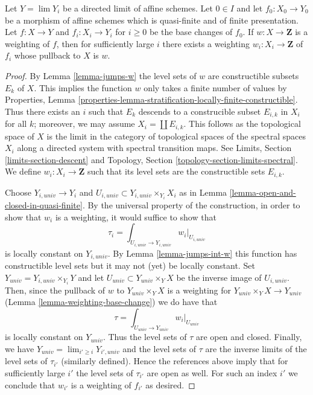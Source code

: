 \begin{lemma}
\label{lemma-descend-weighting}
Let $Y = \lim Y_i$ be a directed limit of affine schemes. Let $0 \in I$
and let $f_0 : X_0 \to Y_0$ be a morphism of affine schemes which is
quasi-finite and of finite presentation. Let $f : X  \to Y$
and $f_i : X_i \to Y_i$ for $i \geq 0$ be the base changes of $f_0$.
If $w : X \to \mathbf{Z}$ is a weighting of $f$, then for sufficiently
large $i$ there exists a weighting $w_i : X_i \to \mathbf{Z}$
of $f_i$ whose pullback to $X$ is $w$.
\end{lemma}

\begin{proof}
By Lemma \ref{lemma-jumps-w} the level sets of $w$ are constructible subsets
$E_k$ of $X$. This implies the function $w$ only takes a finite number
of values by Properties, Lemma
\ref{properties-lemma-stratification-locally-finite-constructible}.
Thus there exists an $i$ such that $E_k$ descends to a construcible
subset $E_{i, k}$ in $X_i$ for all $k$; moreover, we may assume
$X_i = \coprod E_{i, k}$. This follows as the topological space
of $X$ is the limit in the category of topological spaces
of the spectral spaces $X_i$ along a directed system with
spectral transition maps. See
Limits, Section \ref{limits-section-descent}
and
Topology, Section \ref{topology-section-limits-spectral}.
We define $w_i : X_i \to \mathbf{Z}$ such that its level
sets are the constructible sets $E_{i, k}$.

\medskip\noindent
Choose $Y_{i, univ} \to Y_i$ and
$U_{i, univ} \subset Y_{i, univ} \times_{Y_i} X_i$
as in Lemma \ref{lemma-open-and-closed-in-quasi-finite}.
By the universal property of the construction, in order to
show that $w_i$ is a weighting, it would suffice to show
that
$$
\tau_i = \textstyle{\int}_{U_{i, univ} \to Y_{i, univ}} w_i|_{U_{i, univ}}
$$
is locally constant on $Y_{i, univ}$. By Lemma \ref{lemma-jumps-int-w}
this function has constructible level sets but it may
not (yet) be locally constant. Set
$Y_{univ} = Y_{i, univ} \times_{Y_i} Y$
and let $U_{univ} \subset Y_{univ} \times_Y X$
be the inverse image of $U_{i, univ}$.
Then, since the pullback of $w$ to $Y_{univ} \times_Y X$
is a weighting for $Y_{univ} \times_Y X \to Y_{univ}$
(Lemma \ref{lemma-weighting-base-change})
we do have that
$$
\tau = \textstyle{\int}_{U_{univ} \to Y_{univ}} w_i|_{U_{univ}}
$$
is locally constant on $Y_{univ}$. Thus the level sets of
$\tau$ are open and closed. Finally, we have
$Y_{univ} = \lim_{i' \geq i} Y_{i', univ}$
and the level sets of $\tau$ are the inverse limits of the
level sets of $\tau_{i'}$ (similarly defined).
Hence the references above imply that for sufficiently
large $i'$ the level sets of $\tau_{i'}$ are open as well.
For such an index $i'$ we conclude that $w_{i'}$
is a weighting of $f_{i'}$ as desired.
\end{proof}